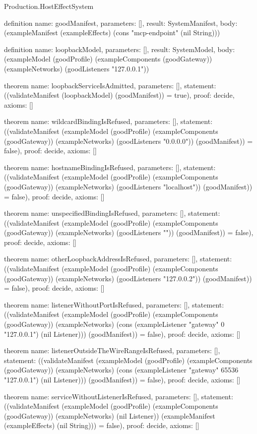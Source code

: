 \begin{lexlean}{Production.HostEffectSystem}
\begin{semanticmodule}
definition{
  name: goodManifest,
  parameters: [],
  result: SystemManifest,
  body: (exampleManifest (exampleEffects) (cons "mcp-endpoint" (nil String)))
}

definition{
  name: loopbackModel,
  parameters: [],
  result: SystemModel,
  body: (exampleModel (goodProfile) (exampleComponents (goodGateway)) (exampleNetworks) (goodListeners "127.0.0.1"))
}

theorem{
  name: loopbackServiceIsAdmitted,
  parameters: [],
  statement: ((validateManifest (loopbackModel) (goodManifest)) = true),
  proof: decide{},
  axioms: []
}

theorem{
  name: wildcardBindingIsRefused,
  parameters: [],
  statement: ((validateManifest (exampleModel (goodProfile) (exampleComponents (goodGateway)) (exampleNetworks) (goodListeners "0.0.0.0")) (goodManifest)) = false),
  proof: decide{},
  axioms: []
}

theorem{
  name: hostnameBindingIsRefused,
  parameters: [],
  statement: ((validateManifest (exampleModel (goodProfile) (exampleComponents (goodGateway)) (exampleNetworks) (goodListeners "localhost")) (goodManifest)) = false),
  proof: decide{},
  axioms: []
}

theorem{
  name: unspecifiedBindingIsRefused,
  parameters: [],
  statement: ((validateManifest (exampleModel (goodProfile) (exampleComponents (goodGateway)) (exampleNetworks) (goodListeners "")) (goodManifest)) = false),
  proof: decide{},
  axioms: []
}

theorem{
  name: otherLoopbackAddressIsRefused,
  parameters: [],
  statement: ((validateManifest (exampleModel (goodProfile) (exampleComponents (goodGateway)) (exampleNetworks) (goodListeners "127.0.0.2")) (goodManifest)) = false),
  proof: decide{},
  axioms: []
}

theorem{
  name: listenerWithoutPortIsRefused,
  parameters: [],
  statement: ((validateManifest (exampleModel (goodProfile) (exampleComponents (goodGateway)) (exampleNetworks) (cons (exampleListener "gateway" 0 "127.0.0.1") (nil Listener))) (goodManifest)) = false),
  proof: decide{},
  axioms: []
}

theorem{
  name: listenerOutsideTheWireRangeIsRefused,
  parameters: [],
  statement: ((validateManifest (exampleModel (goodProfile) (exampleComponents (goodGateway)) (exampleNetworks) (cons (exampleListener "gateway" 65536 "127.0.0.1") (nil Listener))) (goodManifest)) = false),
  proof: decide{},
  axioms: []
}

theorem{
  name: serviceWithoutListenerIsRefused,
  parameters: [],
  statement: ((validateManifest (exampleModel (goodProfile) (exampleComponents (goodGateway)) (exampleNetworks) (nil Listener)) (exampleManifest (exampleEffects) (nil String))) = false),
  proof: decide{},
  axioms: []
}


\end{semanticmodule}
\end{lexlean}
